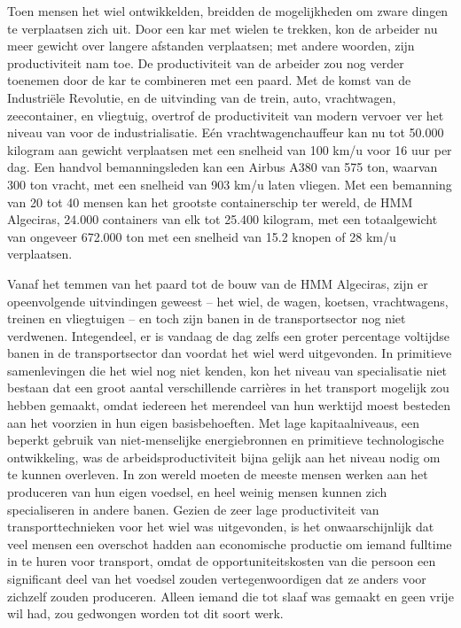 \documentclass[
  a5paper,
  smalldemyvopaper,11pt,twoside,onecolumn,openright,extrafontsizes,
hidelinks]{memoir}
\begin{document}
Toen mensen het wiel ontwikkelden, breidden de mogelijkheden om zware
dingen te verplaatsen zich uit. Door een kar met wielen te trekken, kon
de arbeider nu meer gewicht over langere afstanden verplaatsen; met
andere woorden, zijn productiviteit nam toe. De productiviteit van de
arbeider zou nog verder toenemen door de kar te combineren met een
paard. Met de komst van de Industriële Revolutie, en de uitvinding van
de trein, auto, vrachtwagen, zeecontainer, en vliegtuig, overtrof de
productiviteit van modern vervoer ver het niveau van voor de
industrialisatie. Eén vrachtwagenchauffeur kan nu tot 50.000 kilogram
aan gewicht verplaatsen met een snelheid van 100 km/u voor 16 uur per
dag. Een handvol bemanningsleden kan een Airbus A380 van 575 ton,
waarvan 300 ton vracht, met een snelheid van 903 km/u laten vliegen. Met
een bemanning van 20 tot 40 mensen kan het grootste containerschip ter
wereld, de HMM Algeciras, 24.000 containers van elk tot 25.400 kilogram,
met een totaalgewicht van ongeveer 672.000 ton met een snelheid van 15.2
knopen of 28 km/u verplaatsen.

Vanaf het temmen van het paard tot de bouw van de HMM Algeciras, zijn er
opeenvolgende uitvindingen geweest -- het wiel, de wagen, koetsen,
vrachtwagens, treinen en vliegtuigen -- en toch zijn banen in de
transportsector nog niet verdwenen. Integendeel, er is vandaag de dag
zelfs een groter percentage voltijdse banen in de transportsector dan
voordat het wiel werd uitgevonden. In primitieve samenlevingen die het
wiel nog niet kenden, kon het niveau van specialisatie niet bestaan dat
een groot aantal verschillende carrières in het transport mogelijk zou
hebben gemaakt, omdat iedereen het merendeel van hun werktijd moest
besteden aan het voorzien in hun eigen basisbehoeften. Met lage
kapitaalniveaus, een beperkt gebruik van niet-menselijke energiebronnen
en primitieve technologische ontwikkeling, was de arbeidsproductiviteit
bijna gelijk aan het niveau nodig om te kunnen overleven. In zon wereld
moeten de meeste mensen werken aan het produceren van hun eigen voedsel,
en heel weinig mensen kunnen zich specialiseren in andere banen. Gezien
de zeer lage productiviteit van transporttechnieken voor het wiel was
uitgevonden, is het onwaarschijnlijk dat veel mensen een overschot
hadden aan economische productie om iemand fulltime in te huren voor
transport, omdat de opportuniteitskosten van die persoon een significant
deel van het voedsel zouden vertegenwoordigen dat ze anders voor
zichzelf zouden produceren. Alleen iemand die tot slaaf was gemaakt en
geen vrije wil had, zou gedwongen worden tot dit soort werk.
\end{document}
